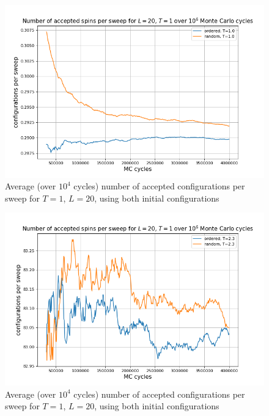 \documentclass[%
oneside,                 %
final,                   %
10pt]{article}
\begin{document}
\begin{figure}[!htb]
        \centering 
         \includegraphics[scale=.55]{../Results/L20T1_acceptedconfigs.png} 
        \caption{Average (over $10^4$ cycles) number of accepted configurations per sweep for $T=1$, $L=20$, using both initial configurations}
        \label{fig:SPIN.configsT1}   
\end{figure} 
\begin{figure}[!htb]
        \centering 
         \includegraphics[scale=.55]{../Results/L20T2_acceptedconfigs.png} 
        \caption{Average (over $10^4$ cycles) number of accepted configurations per sweep for $T=1$, $L=20$, using both initial configurations}
        \label{fig:SPIN.configsT23}   
\end{figure} 
\end{document}
